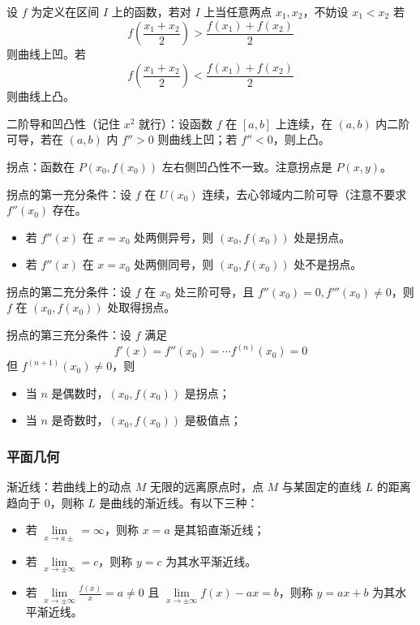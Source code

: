 \begin{definition}[凹凸性]
	设 $f$ 为定义在区间 $I$ 上的函数，若对 $I$ 上当任意两点 $x_1,x_2$，不妨设 $x_1 < x_2$ 若
	\[ f\left(\frac{x_1+x_2}{2}\right) > \frac{f(x_1)+f(x_2)}{2} \]
	则曲线上凹。若
	\[ f\left(\frac{x_1+x_2}{2}\right) < \frac{f(x_1)+f(x_2)}{2} \]
	则曲线上凸。
\end{definition}

二阶导和凹凸性（记住 $x^2$ 就行）：设函数 $f$ 在 $[a, b]$ 上连续，在 $(a, b)$ 内二阶可导，若在 $(a, b)$ 内 $f'' > 0$ 则曲线上凹；若 $f'' < 0$，则上凸。

拐点：函数在 $P(x_0, f(x_0))$ 左右侧凹凸性不一致。注意拐点是 $P(x, y)$。

拐点的第一充分条件：设 $f$ 在 $U(x_0)$ 连续，去心邻域内二阶可导（注意不要求 $f''(x_0)$ 存在。
\begin{itemize}
	\item 若 $f''(x)$ 在 $x=x_0$ 处两侧异号，则 $(x_0, f(x_0))$ 处是拐点。
	\item 若 $f''(x)$ 在 $x=x_0$ 处两侧同号，则 $(x_0, f(x_0))$ 处不是拐点。
\end{itemize}

拐点的第二充分条件：设 $f$ 在 $x_0$ 处三阶可导，且 $f''(x_0) = 0, f'''(x_0) \neq 0$，则 $f$ 在 $(x_0, f(x_0))$ 处取得拐点。

拐点的第三充分条件：设 $f$ 满足
\[ f'(x) = f''(x_0) = \cdots f^{(n)}(x_0) = 0 \]
但 $f^{(n+1)}(x_0) \neq 0$，则
\begin{itemize}
	\item 当 $n$ 是偶数时，$(x_0, f(x_0))$ 是拐点；
	\item 当 $n$ 是奇数时，$(x_0, f(x_0))$ 是极值点；
\end{itemize}

\subsubsection*{平面几何}

渐近线：若曲线上的动点 $M$ 无限的远离原点时，点 $M$ 与某固定的直线 $L$ 的距离趋向于 $0$，则称 $L$ 是曲线的渐近线。有以下三种：
\begin{itemize}
	\item 若 $\lim\limits_{x \to a\pm} = \infty$，则称 $x=a$ 是其铅直渐近线；
	\item 若 $\lim\limits_{x \to \pm \infty} = c$，则称 $y=c$ 为其水平渐近线。
	\item 若 $\lim\limits_{x \to \pm\infty}\frac{f(x)}{x} = a \neq 0$ 且 $\lim\limits_{x \to \pm\infty} f(x) - ax = b$，则称 $y = ax + b$ 为其水平渐近线。
\end{itemize}

